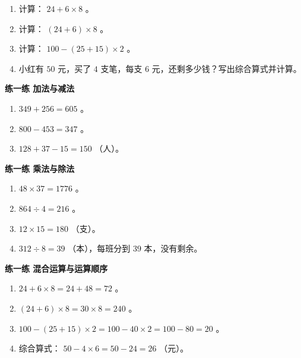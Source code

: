 \begin{practice}


\begin{enumerate}
  \item 计算： $24 + 6 \times 8$ 。
  \item 计算： $(24 + 6) \times 8$ 。
  \item 计算： $100 - (25 + 15) \times 2$ 。
  \item 小红有 $50$ 元，买了 $4$ 支笔，每支 $6$ 元，还剩多少钱？写出综合算式并计算。
\end{enumerate}


\end{practice}



\begin{answer}


\textbf{练一练 加法与减法}

\begin{enumerate}
  \item $349 + 256 = 605$ 。
  \item $800 - 453 = 347$ 。
  \item $128 + 37 - 15 = 150$ （人）。
\end{enumerate}


\textbf{练一练 乘法与除法}

\begin{enumerate}
  \item $48 \times 37 = 1776$ 。
  \item $864 \div 4 = 216$ 。
  \item $12 \times 15 = 180$ （支）。
  \item $312 \div 8 = 39$ （本），每班分到 $39$ 本，没有剩余。
\end{enumerate}


\textbf{练一练 混合运算与运算顺序}

\begin{enumerate}
  \item $24 + 6 \times 8 = 24 + 48 = 72$ 。
  \item $(24 + 6) \times 8 = 30 \times 8 = 240$ 。
  \item $100 - (25 + 15) \times 2 = 100 - 40 \times 2 = 100 - 80 = 20$ 。
  \item 综合算式： $50 - 4 \times 6 = 50 - 24 = 26$ （元）。
\end{enumerate}


\end{answer}
